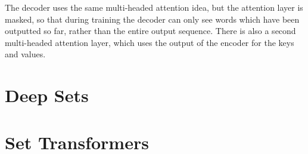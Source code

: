 The decoder uses the same multi-headed attention idea, but the attention layer is masked, so that during training the decoder can only see words which have been outputted so far, rather than the entire output sequence. There is also a second multi-headed attention layer, which uses the output of the encoder for the keys and values.

\section{Deep Sets}

\section {Set Transformers}
